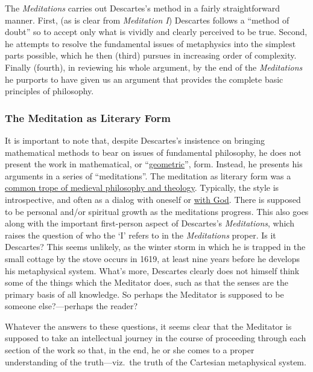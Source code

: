 \documentclass[12pt]{article}
\begin{document}
The \emph{Meditations} carries out Descartes's method in a fairly straightforward manner.
First, (as is clear from \emph{Meditation I}) Descartes follows a ``method of doubt'' so to
accept only what is vividly and clearly perceived to be true. Second, he attempts to
resolve the fundamental issues of metaphysics into the simplest parts possible, which
he then (third) pursues in increasing order of complexity. Finally (fourth), in
reviewing his whole argument, by the end of the \emph{Meditations} he purports to have given
us an argument that provides the complete basic principles of philosophy.

\subsubsection{The Meditation as Literary Form}
\label{sec:org5648990}
It is important to note that, despite Descartes's insistence on bringing mathematical
methods to bear on issues of fundamental philosophy, he does not present the work in
mathematical, or ``\href{https://iep.utm.edu/geo-meth/}{geometric}'', form. Instead, he presents his arguments in a series of
``meditations''. The meditation as literary form was a \href{http://plato.stanford.edu/entries/medieval-literary/\#MedSol}{common trope of medieval
philosophy and theology}. Typically, the style is introspective, and often as a dialog
with oneself or \href{http://plato.stanford.edu/entries/augustine/\#ReaCon}{with God}. There is supposed to be personal and/or spiritual growth as
the meditations progress. This also goes along with the important first-person aspect
of Descartes's \emph{Meditations}, which raises the question of who the `I' refers to in the
\emph{Meditations} proper. Is it Descartes? This seems unlikely, as the winter storm in
which he is trapped in the small cottage by the stove occurs in 1619, at least nine
years before he develops his metaphysical system. What's more, Descartes clearly does
not himself think some of the things which the Meditator does, such as that the
senses are the primary basis of all knowledge. So perhaps the Meditator is supposed
to be someone else?---perhaps the reader?

Whatever the answers to these questions, it seems clear that the Meditator is
supposed to take an intellectual journey in the course of proceeding through each
section of the work so that, in the end, he or she comes to a proper understanding of
the truth---viz. the truth of the Cartesian metaphysical system.
\end{document}
